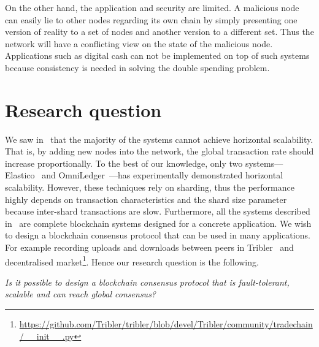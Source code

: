On the other hand, the application and security are limited.
A malicious node can easily lie to other nodes regarding its own chain by simply presenting one version of reality to a set of nodes and another version to a different set.
Thus the network will have a conflicting view on the state of the malicious node.
Applications such as digital cash can not be implemented on top of such systems because consistency is needed in solving the double spending problem.



\section{Research question}

We saw in~ that the majority of the systems cannot achieve horizontal scalability.
That is, by adding new nodes into the network, the global transaction rate should increase proportionally.
To the best of our knowledge, only two systems---Elastico~\cite{luu2016elastico} and OmniLedger~\cite{kokoris2017omniledger}---has experimentally demonstrated horizontal scalability.
However, these techniques rely on sharding, thus the performance highly depends on transaction characteristics and the shard size parameter because inter-shard transactions are slow.
Furthermore, all the systems described in~ are complete blockchain systems designed for a concrete application.
We wish to design a blockchain consensus protocol that can be used in many applications.
For example recording uploads and downloads between peers in Tribler~\cite{pouwelse2008tribler, multichain} and decentralised market\footnote{\url{https://github.com/Tribler/tribler/blob/devel/Tribler/community/tradechain/__init__.py}}.
Hence our research question is the following.
\begin{displayquote}
\emph{Is it possible to design a blockchain consensus protocol that is fault-tolerant, scalable and can reach global consensus?}
\end{displayquote}

